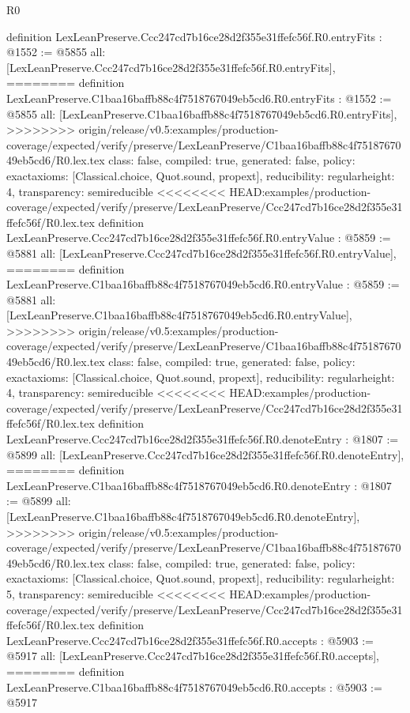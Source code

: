 \begin{lexlean}{R0}
\begin{coremodule}
{{{{{{{{{{{{{{{{{{{{{{{{{{{{{{{{{{{{{{{{{{{{{{{{{{{{{{{{{{{{{{{{{{{{{{{{{{{{{{{{{{{{{{{{{{{{{{{{{{definition LexLeanPreserve.Ccc247cd7b16ce28d2f355e31ffefc56f.R0.entryFits : @1552 := @5855 {
  all: [LexLeanPreserve.Ccc247cd7b16ce28d2f355e31ffefc56f.R0.entryFits],
========
definition LexLeanPreserve.C1baa16baffb88c4f7518767049eb5cd6.R0.entryFits : @1552 := @5855 {
  all: [LexLeanPreserve.C1baa16baffb88c4f7518767049eb5cd6.R0.entryFits],
>>>>>>>> origin/release/v0.5:examples/production-coverage/expected/verify/preserve/LexLeanPreserve/C1baa16baffb88c4f7518767049eb5cd6/R0.lex.tex
  class: false,
  compiled: true,
  generated: false,
  policy: exact{axioms: [Classical.choice, Quot.sound, propext]},
  reducibility: regular{height: 4},
  transparency: semireducible
}
<<<<<<<< HEAD:examples/production-coverage/expected/verify/preserve/LexLeanPreserve/Ccc247cd7b16ce28d2f355e31ffefc56f/R0.lex.tex
definition LexLeanPreserve.Ccc247cd7b16ce28d2f355e31ffefc56f.R0.entryValue : @5859 := @5881 {
  all: [LexLeanPreserve.Ccc247cd7b16ce28d2f355e31ffefc56f.R0.entryValue],
========
definition LexLeanPreserve.C1baa16baffb88c4f7518767049eb5cd6.R0.entryValue : @5859 := @5881 {
  all: [LexLeanPreserve.C1baa16baffb88c4f7518767049eb5cd6.R0.entryValue],
>>>>>>>> origin/release/v0.5:examples/production-coverage/expected/verify/preserve/LexLeanPreserve/C1baa16baffb88c4f7518767049eb5cd6/R0.lex.tex
  class: false,
  compiled: true,
  generated: false,
  policy: exact{axioms: [Classical.choice, Quot.sound, propext]},
  reducibility: regular{height: 4},
  transparency: semireducible
}
<<<<<<<< HEAD:examples/production-coverage/expected/verify/preserve/LexLeanPreserve/Ccc247cd7b16ce28d2f355e31ffefc56f/R0.lex.tex
definition LexLeanPreserve.Ccc247cd7b16ce28d2f355e31ffefc56f.R0.denoteEntry : @1807 := @5899 {
  all: [LexLeanPreserve.Ccc247cd7b16ce28d2f355e31ffefc56f.R0.denoteEntry],
========
definition LexLeanPreserve.C1baa16baffb88c4f7518767049eb5cd6.R0.denoteEntry : @1807 := @5899 {
  all: [LexLeanPreserve.C1baa16baffb88c4f7518767049eb5cd6.R0.denoteEntry],
>>>>>>>> origin/release/v0.5:examples/production-coverage/expected/verify/preserve/LexLeanPreserve/C1baa16baffb88c4f7518767049eb5cd6/R0.lex.tex
  class: false,
  compiled: true,
  generated: false,
  policy: exact{axioms: [Classical.choice, Quot.sound, propext]},
  reducibility: regular{height: 5},
  transparency: semireducible
}
<<<<<<<< HEAD:examples/production-coverage/expected/verify/preserve/LexLeanPreserve/Ccc247cd7b16ce28d2f355e31ffefc56f/R0.lex.tex
definition LexLeanPreserve.Ccc247cd7b16ce28d2f355e31ffefc56f.R0.accepts : @5903 := @5917 {
  all: [LexLeanPreserve.Ccc247cd7b16ce28d2f355e31ffefc56f.R0.accepts],
========
definition LexLeanPreserve.C1baa16baffb88c4f7518767049eb5cd6.R0.accepts : @5903 := @5917 {
}}}}}}}}}}}}}}}}}}}}}}}}}}}}}}}}}}}}}}}}}}}}}}}}}}}}}}}}}}}}}}}}}}}}}}}}}}}}}}}}}}}}}}}}}}}}}}}}}}}}}}}
\end{coremodule}
\end{lexlean}
